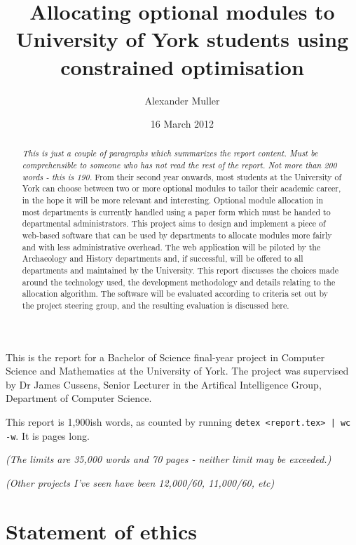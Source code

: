 \documentclass[]{scrartcl}
\title{Allocating optional modules to University of York students using constrained optimisation}
\author{Alexander Muller}
\date{16 March 2012}
\begin{document}
\ifpdf
{}
\else
{}
\fi

\maketitle

This is the report for a Bachelor of Science final-year project in Computer Science and Mathematics at the University of York. The project was supervised by Dr James Cussens, Senior Lecturer in the Artifical Intelligence Group, Department of Computer Science.

This report is 1,900ish words, as counted by running \verb+detex <report.tex> | wc -w+. It is \pageref{LastPage} pages long.

\textit{(The limits are 35,000 words and 70 pages - neither limit may be exceeded.)}

\textit{(Other projects I've seen have been 12,000/60, 11,000/60, etc)}

\newpage

\begin{abstract}
  \textit{This is \emph{just} a couple of paragraphs which summarizes the report content. Must be comprehensible to someone who has not read the rest of the report.}
  \textit{Not more than 200 words - this is 190.}
  From their second year onwards, most students at the University of York can  choose between two or more optional modules to tailor their academic career, in the hope it will be more relevant and interesting. Optional module allocation in most departments is currently handled using a paper form which must be handed to departmental administrators. This project aims to design and implement a piece of web-based software that can be used by departments to allocate modules more fairly and with less administrative overhead.
  The web application will be piloted by the Archaeology and History departments and, if successful, will be offered to all departments and maintained by the University.
  This report discusses the choices made around the technology used, the development methodology and details relating to the allocation algorithm.
  The software will be evaluated according to criteria set out by the project steering group, and the resulting evaluation is discussed here.
\end{abstract}

\newpage
\tableofcontents
\newpage

\section{Statement of ethics}
\end{document}
